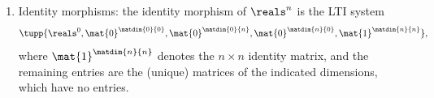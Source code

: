 \begin{ctdefinition}
\begin{enumerate}
\begin{equation}
\begin{aligned}
\begin{bmatrix}
                                  \mat{A}_\mora              & \mat{0}       \\
                                  \mat{B}_\morb\mat{C}_\mora & \mat{A}_\morb
                              \end{bmatrix},\quad
                      \mat{B}=\begin{bmatrix}
                                  \mat{B}_\mora \\
                                  \mat{B}_\morb\mat{D}_\mora
                              \end{bmatrix}, \\
                      \mat{C}  & =\begin{bmatrix}
                                      \mat{D}_\morb\mat{C}_\mora & \mat{C}_\morb
                                  \end{bmatrix}, \quad
                      \mat{D}=\mat{D}_\morb\mat{D}_\mora.
                  \end{aligned}
              \end{equation}
        \item Identity morphisms: the identity morphism of $\reals^n$ is the LTI system
              \begin{equation}
                  \tupp{\reals^0, \mat{0}^{\matdim{0}{0}},\mat{0}^{\matdim{0}{n}},\mat{0}^{\matdim{n}{0}},\mat{1}^{\matdim{n}{n}}},
              \end{equation}
              where $\mat{1}^{\matdim{n}{n}}$ denotes the $n \times n$ identity matrix, and the remaining entries are the (unique) matrices of the indicated dimensions, which have no entries.
    \end{enumerate}
\end{ctdefinition}


